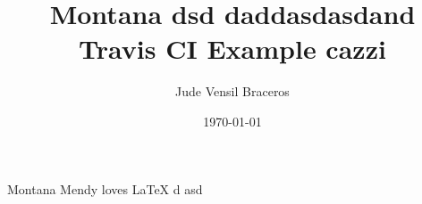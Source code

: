 \documentclass{article}
\title{Montana dsd  daddasdasdand Travis CI Example cazzi}
\author{Jude Vensil Braceros}
\date{\today}
\begin{document}
\maketitle

Montana Mendy loves LaTeX d asd
\end{document}
